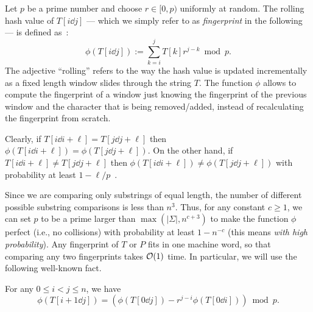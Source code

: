 

Let $p$ be a prime number and choose $r \in [0,p)$ uniformly at random. 
The rolling hash value of $T[i \dd j]$ --- which we simply refer to as \textit{fingerprint} in the following --- is defined as~\cite{DBLP:journals/ibmrd/KarpR87}: 
$$
\phi(T[i\dd j]) := \sum^{j}_{k=i}T[k]r^{j-k}\bmod p.
$$
The adjective ``rolling'' refers to the way the hash value is updated incrementally as
a fixed length window slides through the string $T$.
The function $\phi$ allows to compute the fingerprint of a window just knowing the fingerprint of the previous window and the character that is being removed/added, instead of recalculating the fingerprint from scratch.

Clearly, if $T[i\dd i + \ell] = T[j\dd j + \ell]$ then $\phi(T[i \dd i+\ell]) = \phi(T[j \dd j+\ell])$. 
On the other hand, if $T[i\dd i + \ell] \neq T[j\dd j + \ell]$ then $\phi(T[i \dd i+\ell]) \neq \phi(T[j \dd j+\ell])$ with probability at least $1-\ell/p$~\cite{DBLP:conf/icalp/DietzfelbingerGMP92}.

Since we are comparing only substrings of equal length, the number of different possible substring comparisons is less than $n^3$. Thus, for any constant $c\geq 1$, we can set $p$ to be a
prime larger than $\max(|\Sigma|,n^{c+3})$ to make the function $\phi$ perfect (i.e., no collisions) with probability at least $1 - n^{-c}$ (this means \emph{with high probability}). Any fingerprint of $T$ or $P$ fits in one machine word, so that comparing any two fingerprints takes $\mathcal{O}(1)$ time.
In particular, we will use the following well-known fact.

\begin{fact}\label{fact:KR}
For any $0 \leq i < j \leq n$, we have
$$
\phi(T[i+1 \dd j]) = ( \phi(T[0 \dd j]) - r^{j-i}\phi(T[0 \dd i]) ) \bmod p.
$$
\end{fact}
